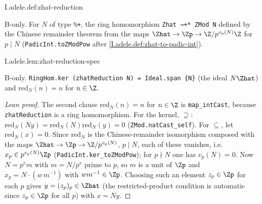 \begin{definition}
\bonly
{}
\end{definition}
\begin{tfformal}{I.adele.def:zhat-reduction}
\begin{tffidelity}
B-only. For $N$ of type \texttt{ℕ+}, the ring homomorphism \texttt{Zhat →+* ZMod N} defined by the Chinese remainder theorem from the maps $\Zhat\to\Zp\to\Z/p^{v_p(N)}\Z$ for $p\mid N$ (\texttt{PadicInt.toZModPow} after \cref{I.adele.def:zhat-to-padic-int}).
\end{tffidelity}
\end{tfformal}

\begin{lemma}
\bonly
{}
\end{lemma}
\begin{tfformal}{I.adele.lem:zhat-reduction-spec}
\begin{tffidelity}
B-only. \texttt{RingHom.ker (zhatReduction N) = Ideal.span \{N\}} (the ideal $N\Zhat$) and $\mathrm{red}_N(n)=n$ for $n\in\Z$.
\end{tffidelity}
\end{tfformal}
\begin{proof}[Lean proof]
The second clause $\mathrm{red}_N(n)=n$ for $n\in\Z$ is \texttt{map\_intCast}, because \texttt{zhatReduction} is a ring homomorphism. For the kernel, $\supseteq$: $\mathrm{red}_N(Ny)=\mathrm{red}_N(N)\mathrm{red}_N(y)=0$ (\texttt{ZMod.natCast\_self}). For $\subseteq$, let $\mathrm{red}_N(x)=0$. Since $\mathrm{red}_N$ is the Chinese-remainder isomorphism composed with the maps $\Zhat\to\Zp\to\Z/p^{v_p(N)}$, $p\mid N$, each of these vanishes, i.e.\ $x_p\in p^{v_p(N)}\Zp$ (\texttt{PadicInt.ker\_toZModPow}); for $p\nmid N$ one has $v_p(N)=0$. Now $N=p^{v}m$ with $m=N/p^v$ prime to $p$, so $m$ is a unit of $\Zp$ and $x_p=N\cdot(w\,m^{-1})$ with $w m^{-1}\in\Zp$. Choosing such an element $z_p\in\Zp$ for each $p$ gives $y=(z_p)_p\in\Zhat$ (the restricted-product condition is automatic since $z_p\in\Zp$ for all $p$) with $x=Ny$.
\end{proof}

